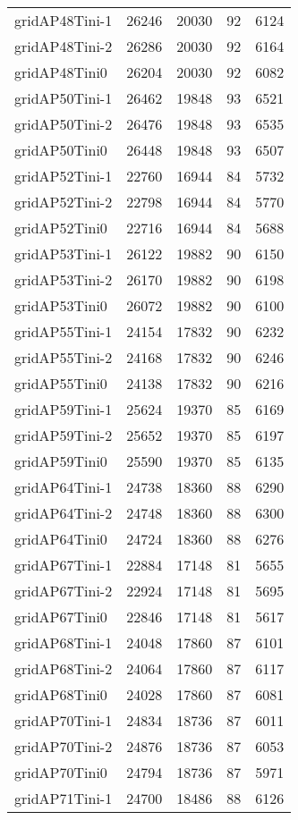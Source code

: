 \begin{longtable}{lrrrr}
gridAP48Tini-1 & 26246 & 20030 & 92 & 6124 \\
gridAP48Tini-2 & 26286 & 20030 & 92 & 6164 \\
gridAP48Tini0 & 26204 & 20030 & 92 & 6082 \\
gridAP50Tini-1 & 26462 & 19848 & 93 & 6521 \\
gridAP50Tini-2 & 26476 & 19848 & 93 & 6535 \\
gridAP50Tini0 & 26448 & 19848 & 93 & 6507 \\
gridAP52Tini-1 & 22760 & 16944 & 84 & 5732 \\
gridAP52Tini-2 & 22798 & 16944 & 84 & 5770 \\
gridAP52Tini0 & 22716 & 16944 & 84 & 5688 \\
gridAP53Tini-1 & 26122 & 19882 & 90 & 6150 \\
gridAP53Tini-2 & 26170 & 19882 & 90 & 6198 \\
gridAP53Tini0 & 26072 & 19882 & 90 & 6100 \\
gridAP55Tini-1 & 24154 & 17832 & 90 & 6232 \\
gridAP55Tini-2 & 24168 & 17832 & 90 & 6246 \\
gridAP55Tini0 & 24138 & 17832 & 90 & 6216 \\
gridAP59Tini-1 & 25624 & 19370 & 85 & 6169 \\
gridAP59Tini-2 & 25652 & 19370 & 85 & 6197 \\
gridAP59Tini0 & 25590 & 19370 & 85 & 6135 \\
gridAP64Tini-1 & 24738 & 18360 & 88 & 6290 \\
gridAP64Tini-2 & 24748 & 18360 & 88 & 6300 \\
gridAP64Tini0 & 24724 & 18360 & 88 & 6276 \\
gridAP67Tini-1 & 22884 & 17148 & 81 & 5655 \\
gridAP67Tini-2 & 22924 & 17148 & 81 & 5695 \\
gridAP67Tini0 & 22846 & 17148 & 81 & 5617 \\
gridAP68Tini-1 & 24048 & 17860 & 87 & 6101 \\
gridAP68Tini-2 & 24064 & 17860 & 87 & 6117 \\
gridAP68Tini0 & 24028 & 17860 & 87 & 6081 \\
gridAP70Tini-1 & 24834 & 18736 & 87 & 6011 \\
gridAP70Tini-2 & 24876 & 18736 & 87 & 6053 \\
gridAP70Tini0 & 24794 & 18736 & 87 & 5971 \\
gridAP71Tini-1 & 24700 & 18486 & 88 & 6126 \\

\end{longtable}
